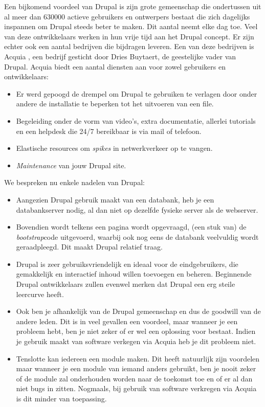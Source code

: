 \noindent
Een bijkomend voordeel van Drupal is zijn grote gemeenschap die ondertussen uit al meer dan 630000 actieve gebruikers en ontwerpers bestaat die zich dagelijks inspannen om Drupal steeds beter te maken. Dit aantal neemt elke dag toe. Veel van deze ontwikkelaars werken in hun vrije tijd aan het Drupal concept. Er zijn echter ook een aantal bedrijven die bijdragen leveren. Een van deze bedrijven is Acquia \cite{acquia}, een bedrijf gesticht door Dries Buytaert, de geestelijke vader van Drupal. Acquia biedt een aantal diensten aan voor zowel gebruikers en ontwikkelaars:
\begin{itemize}
\item Er werd gepoogd de drempel om Drupal te gebruiken te verlagen door onder andere de installatie te beperken tot het uitvoeren van een file. \item Begeleiding onder de vorm van video's, extra documentatie, allerlei tutorials en een helpdesk die 24/7 bereikbaar is via mail of telefoon.
\item Elastische resources om \textit{spikes} in netwerkverkeer op te vangen.
\item \textit{Maintenance} van jouw Drupal site.
\end{itemize}

\noindent
We bespreken nu enkele nadelen van Drupal:
\begin{itemize}
\item Aangezien Drupal gebruik maakt van een databank, heb je een databankserver nodig, al dan niet op dezelfde fysieke server als de webserver.
\item Bovendien wordt telkens een pagina wordt opgevraagd, (een stuk van) de \textit{bootstrap}code uitgevoerd, waarbij ook nog eens de databank veelvuldig wordt geraadpleegd. 
Dit maakt Drupal relatief traag.
\item Drupal is zeer gebruiksvriendelijk en ideaal voor de eindgebruikers, die gemakkelijk en interactief inhoud willen toevoegen en beheren. 
Beginnende Drupal ontwikkelaars zullen evenwel merken dat Drupal een erg steile leercurve heeft.
\item Ook ben je afhankelijk van de Drupal gemeenschap en dus de goodwill van de andere leden. Dit is in veel gevallen een voordeel, maar wanneer je een probleem hebt, ben je niet zeker of er wel een oplossing voor bestaat. Indien je gebruik maakt van software verkegen via Acquia heb je dit probleem niet.
\item Tenslotte kan iedereen een module maken. Dit heeft natuurlijk zijn voordelen maar wanneer je een module van iemand anders gebruikt, ben je nooit zeker of de module zal onderhouden worden naar de toekomst toe en of er al dan niet bugs in zitten. Nogmaals, bij gebruik van software verkregen via Acquia is dit minder van toepassing.
\end{itemize}

